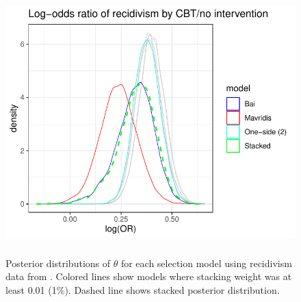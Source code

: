 \documentclass[12pt]{article}   	%
\numberwithin{equation}{section}
\begin{document}
\begin{figure}
\includegraphics[height = 4in, width = 5in]{landenberger_post.pdf}
\caption{Posterior distributions of $\theta$ for each selection model using recidivism data from \citet{landenberger2005recidivism}. Colored lines show models where stacking weight was at least 0.01 (1\%).
Dashed line shows stacked posterior distribution.}
\label{fig:landenberger}
\end{figure}



\end{document}
